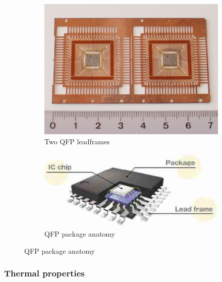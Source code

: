 \documentclass[final]{cubedoc}
\begin{document}
\begin{figure}[h!]
\centering
\begin{subfigure}{.5\textwidth}
  \centering
  \includegraphics[keepaspectratio, width=0.7\linewidth]{docs/leadframe_qfp.jpg}
  \caption{Two QFP leadframes}
  \label{fig:sub1}
\end{subfigure}%
\begin{subfigure}{.5\textwidth}
  \centering
  \includegraphics[keepaspectratio, width=\linewidth, height=.6\textheight]{docs/qfp_anatomy.jpg}
  \caption{QFP package anatomy}
  \label{fig:sub2}
\end{subfigure}
\label{fig:test}
\end{figure}

\subsubsection{Thermal properties}


\end{document}
